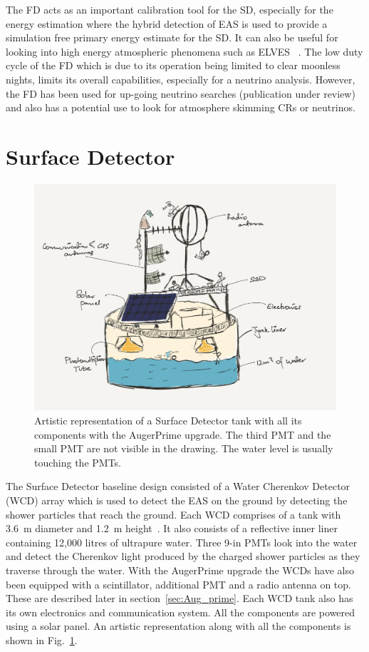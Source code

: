 The FD acts as an important calibration tool for the SD, especially for the energy estimation where the hybrid detection of EAS is used to provide a simulation free primary energy estimate for the SD. It can also be useful for looking into high energy atmospheric phenomena such as ELVES ~\cite{PierreAuger:2020lri}. The low duty cycle of the FD which is due to its operation being limited to clear moonless nights, limits its overall capabilities, especially for a neutrino analysis. However, the FD has been used for up-going neutrino searches (publication under review) and also has a potential use to look for atmosphere skimming CRs or neutrinos.  

\section{Surface Detector}
\label{sec:Sur_det}

\begin{figure}[h!]
  \centering
  \includegraphics[width=\textwidth]{thesis_figures/Setup/SD_tank_schematics_drawing.png}
  \caption{Artistic representation of a Surface Detector tank with all its components with the AugerPrime upgrade. The third PMT and the small PMT are not visible in the drawing. The water level is usually touching the PMTs.}
  \label{fig:SD_drawing}
  \end{figure}

The Surface Detector baseline design consisted of a Water Cherenkov Detector (WCD) array which is used to detect the EAS on the ground by detecting the shower particles that reach the ground. Each WCD comprises of a tank with 3.6 m diameter and 1.2 m height~\cite{PierreAuger:2007kus}. It also consists of a reflective inner liner containing 12,000 litres of ultrapure water. Three 9-in PMTs look into the water and detect the Cherenkov light produced by the charged shower particles as they traverse through the water. With the AugerPrime upgrade the WCDs have also been equipped with a scintillator, additional PMT and a radio antenna on top. These are described later in section~\ref{sec:Aug_prime}. Each WCD tank also has its own electronics and communication system. All the components are powered using a solar panel. An artistic representation along with all the components is shown in Fig.~\ref{fig:SD_drawing}. 

